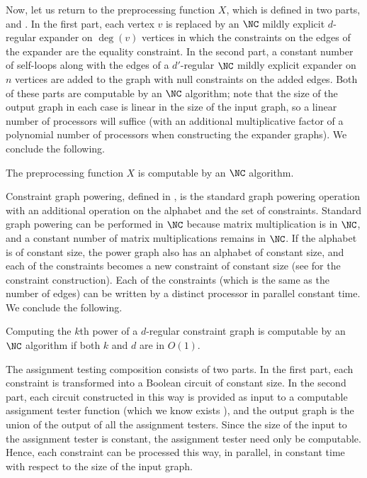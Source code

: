 Now, let us return to the preprocessing function $X$, which is defined in two parts, \autocite[Definition~4.1]{dinur07} and \autocite[Definition~4.2]{dinur07}.
In the first part, each vertex $v$ is replaced by an $\NC$ mildly explicit $d$-regular expander on $\deg(v)$ vertices in which the constraints on the edges of the expander are the equality constraint.
In the second part, a constant number of self-loops along with the edges of a $d'$-regular $\NC$ mildly explicit expander on $n$ vertices are added to the graph with null constraints on the added edges.
Both of these parts are computable by an $\NC$ algorithm; note that the size of the output graph in each case is linear in the size of the input graph, so a linear number of processors will suffice (with an additional multiplicative factor of a polynomial number of processors when constructing the expander graphs).
We conclude the following.

\begin{lemma}
  The preprocessing function $X$ is computable by an $\NC$ algorithm.
\end{lemma}

Constraint graph powering, defined in \autocite[Section~1.2]{dinur07}, is the standard graph powering operation with an additional operation on the alphabet and the set of constraints.
Standard graph powering can be performed in $\NC$ because matrix multiplication is in $\NC$, and a constant number of matrix multiplications remains in $\NC$.
If the alphabet is of constant size, the power graph also has an alphabet of constant size, and each of the constraints becomes a new constraint of constant size (see \autocite[Section~1.2]{dinur07} for the constraint construction).
Each of the constraints (which is the same as the number of edges) can be written by a distinct processor in parallel constant time.
We conclude the following.

\begin{lemma}
  Computing the $k$th power of a $d$-regular constraint graph is computable by an $\NC$ algorithm if both $k$ and $d$ are in $O(1)$.
\end{lemma}

The assignment testing composition \autocite[Definition~5.1]{dinur07} consists of two parts.
In the first part, each constraint is transformed into a Boolean circuit of constant size.
In the second part, each circuit constructed in this way is provided as input to a computable assignment tester function (which we know exists \autocite[Theorem~5.1]{dinur07}), and the output graph is the union of the output of all the assignment testers.
Since the size of the input to the assignment tester is constant, the assignment tester need only be computable.
Hence, each constraint can be processed this way, in parallel, in constant time with respect to the size of the input graph.

